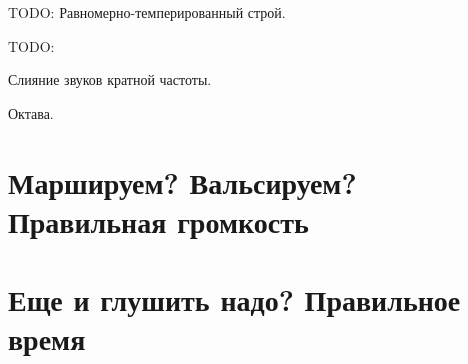 TODO: Равномерно-темперированный строй.

TODO:
% 
% 


Слияние звуков кратной частоты.

Октава.

\section{Маршируем? Вальсируем? Правильная громкость}
\label{sec:music:sounds}


\section{Еще и глушить надо? Правильное время}



